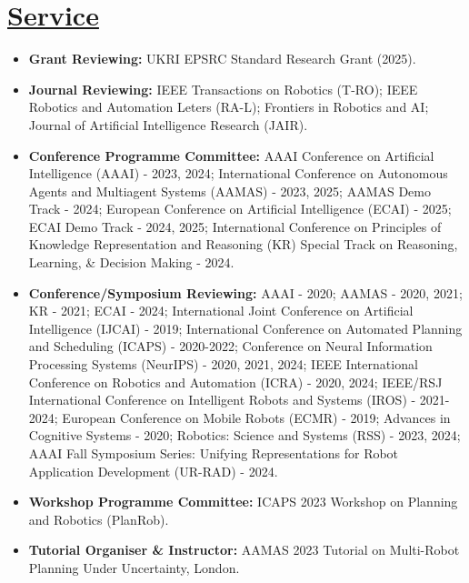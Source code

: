 \documentclass[11pt]{article}
\begin{document}
\section*{\underline{Service}}
\begin{itemize}
\item \textbf{Grant Reviewing:} UKRI EPSRC Standard Research Grant (2025).
\item \textbf{Journal Reviewing:} IEEE Transactions on Robotics (T-RO); IEEE Robotics and Automation Leters (RA-L); Frontiers in Robotics and AI; Journal of Artificial Intelligence Research (JAIR).
\item \textbf{Conference Programme Committee:}  AAAI Conference on Artificial Intelligence (AAAI) - 2023, 2024; International Conference on Autonomous Agents and Multiagent Systems (AAMAS) - 2023, 2025; AAMAS Demo Track - 2024; European Conference on Artificial Intelligence (ECAI) - 2025; ECAI Demo Track - 2024, 2025; International Conference on Principles of Knowledge Representation and Reasoning (KR) Special Track on Reasoning, Learning, \& Decision Making - 2024.
\item \textbf{Conference/Symposium Reviewing:} AAAI - 2020; AAMAS - 2020, 2021; KR - 2021; ECAI - 2024; International Joint Conference on Artificial Intelligence (IJCAI) - 2019; International Conference on Automated Planning and Scheduling (ICAPS) - 2020-2022; Conference on Neural Information Processing Systems (NeurIPS) - 2020, 2021, 2024; IEEE International Conference on Robotics and Automation (ICRA) - 2020, 2024; IEEE/RSJ International Conference on Intelligent Robots and Systems (IROS) - 2021-2024; European Conference on Mobile Robots (ECMR) - 2019; Advances in Cognitive Systems - 2020;  Robotics: Science and Systems (RSS) - 2023, 2024; AAAI Fall Symposium Series: Unifying Representations for Robot Application Development (UR-RAD) - 2024.
\item\textbf{Workshop Programme Committee:} ICAPS 2023 Workshop on Planning and Robotics (PlanRob).
\item \textbf{Tutorial Organiser \& Instructor:} AAMAS 2023 Tutorial on Multi-Robot Planning Under Uncertainty, London.
\end{itemize}
\end{document}
